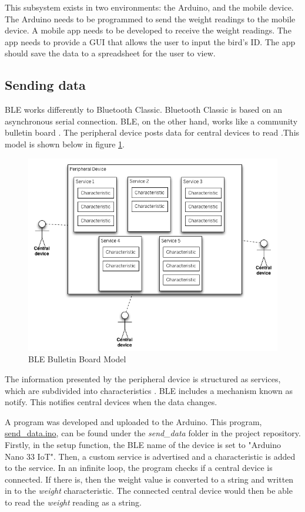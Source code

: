 \documentclass[class=report,11pt,crop=false]{standalone}
\begin{document}
		This subsystem exists in two environments: the Arduino, and the mobile device. The Arduino needs to be programmed to send the weight readings to the mobile device. A mobile app needs to be developed to receive the weight readings. The app needs to provide a GUI that allows the user to input the bird's ID. The app should save the data to a spreadsheet for the user to view.
		
	
		\subsection{Sending data}
		
			BLE works differently to Bluetooth Classic. Bluetooth Classic is based on an asynchronous serial connection. BLE, on the other hand, works like a community bulletin board \cite{ble}. The peripheral device posts data for central devices to read \cite{ble}.This model is shown below in figure \ref{fig:ble-bulletin-board-model}.
			
			\begin{figure}[h!]
				\centering
				\includegraphics[scale=0.5]{Figures/ble-bulletin-board-model}
				\caption{BLE Bulletin Board Model \cite{ble}}
				\label{fig:ble-bulletin-board-model}
			\end{figure}
			
			The information presented by the peripheral device is structured as services, which are subdivided into characteristics \cite{ble}. BLE includes a mechanism known as notify. This notifies central devices when the data changes.
			
			A program was developed and uploaded to the Arduino. This program, \href{https://github.com/karanimaan/EEE4113F-Project--Group-26/blob/main/send_data/send_data.ino}{send\_data.ino}, can be found under the \textit{send\_data} folder in the project repository.
			Firstly, in the setup function, the BLE name of the device is set to "Arduino Nano 33 IoT".
			Then, a custom service is advertised and a characteristic is added to the service.
			In an infinite loop, the program checks if a central device is connected. If there is, then the weight value is converted to a string and written in to the \textit{weight} characteristic. The connected central device would then be able to read the \textit{weight} reading as a string.
			
\end{document}
